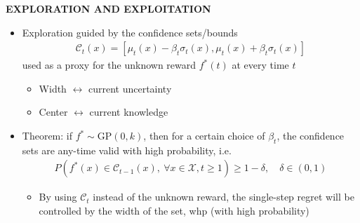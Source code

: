 \begin{whitebox}{\textbf{EXPLORATION AND EXPLOITATION}}
    \begin{itemize}
        \item Exploration guided by the confidence sets/bounds
        \begin{align*}
            \mathcal{C}_t(x)=[\mu_t(x)-\beta_t\sigma_t(x),\mu_t(x)+\beta_t\sigma_t(x)]
        \end{align*}
        used as a proxy for the unknown reward $f^*(t)$ at every time $t$
        \begin{itemize}
            \item Width $\longleftrightarrow$ current uncertainty
            \item Center $\longleftrightarrow$ current knowledge
        \end{itemize}
        \item Theorem: if $f^*\sim\mathrm{GP}(0,k)$, then for a certain choice of $\beta_t$, the confidence sets are any-time valid with high probability, i.e.
        \begin{align*}
            P(f^*(x)\in\mathcal{C}_{t-1}(x),\ \forall x\in\mathcal{X},t\geq 1)\geq 1-\delta,\quad\delta\in(0,1)
        \end{align*}
        \begin{itemize}
            \item By using $\mathcal{C}_t$ instead of the unknown reward, the single-step regret will be controlled by the width of the set, whp (with high probability)
        \end{itemize}
    \end{itemize}
\end{whitebox}

